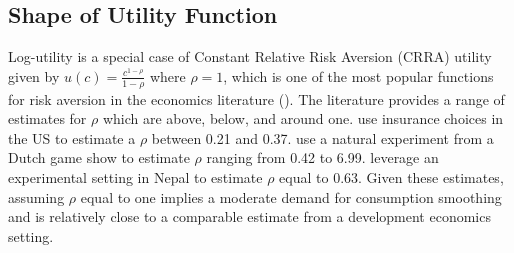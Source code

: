 \documentclass[12pt]{article}
\begin{document}
\begin{table}[H]
\centering
\caption{Sample Construction}\label{table:sampleconstruction}
\vspace{-2mm}
\end{table}



\subsection{Shape of Utility Function}\label{appendix:utilityshape}

Log-utility is a special case of Constant Relative Risk Aversion (CRRA) utility given by $u(c) = \frac{c^{1-\rho}}{1-\rho}$ where $\rho=1$, which is one of the most popular functions for risk aversion in the economics literature (\cite{wakker2008explaining}).  The literature provides a range of estimates for $\rho$ which are above, below, and around one.  \cite{barseghyan2013nature} use insurance choices in the US to estimate a $\rho$ between 0.21 and 0.37.  \cite{beetsma2001measuring} use a natural experiment from a Dutch game show to estimate $\rho$ ranging from 0.42 to 6.99.  \cite{carvalho2016effect} leverage an experimental setting in Nepal to estimate $\rho$ equal to 0.63.  Given these estimates, assuming $\rho$ equal to one implies a moderate demand for consumption smoothing and is relatively close to a comparable estimate from a development economics setting.  
\end{document}
